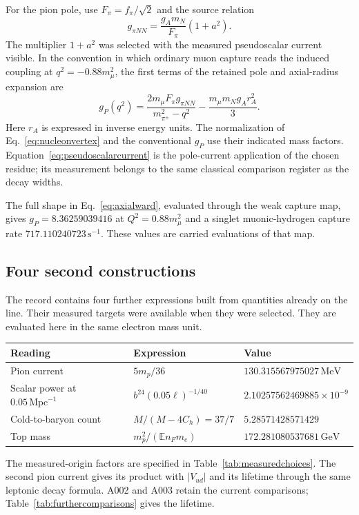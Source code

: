 \documentclass[aps,prx,onecolumn,10pt,notitlepage,nofootinbib,longbibliography]{revtex4-2}
\numberwithin{equation}{section}
\numberwithin{table}{section}
\newcommand{\EE}{\mathbb E}
\newcommand{\MeV}{\,\mathrm{MeV}}
\newcommand{\GeV}{\,\mathrm{GeV}}
\begin{document}
For the pion pole, use $F_\pi=f_\pi/\sqrt2$ and the source relation
\begin{equation}
 g_{\pi NN}=\frac{g_A m_N}{F_\pi}(1+a^2).
 \label{eq:pionnucleoncoupling}
\end{equation}
The multiplier $1+a^2$ was selected with the measured pseudoscalar current
visible. In the convention in which ordinary muon capture reads the induced
coupling at $q^2=-0.88m_\mu^2$, the first terms of the retained pole and axial-radius expansion are
\begin{equation}
 g_P(q^2)=\frac{2m_\mu F_\pi g_{\pi NN}}{m_{\pi^\pm}^2-q^2}
          -\frac{m_\mu m_Ng_A r_A^2}{3}.
 \label{eq:pseudoscalarcurrent}
\end{equation}
Here $r_A$ is expressed in inverse energy units. The normalization of
Eq.~\eqref{eq:nucleonvertex} and the conventional $g_P$ use their indicated
mass factors. Equation~\eqref{eq:pseudoscalarcurrent} is the pole-current
application of the chosen residue; its measurement belongs to the same
classical comparison register as the decay widths.


The full shape in Eq.~\eqref{eq:axialward}, evaluated through the
weak capture map, gives $g_P=8.36259039416$ at $Q^2=0.88m_\mu^2$ and a
singlet muonic-hydrogen capture rate $717.110240723\,\mathrm{s}^{-1}$.
These values are carried evaluations of that map.

\subsection{Four second constructions}
\label{sec:secondconstructions}
The record contains four further expressions built from quantities already
on the line. Their measured targets were available when they were selected.
They are evaluated here in the same electron mass unit.
\begin{center}\small
\begin{tabular}{@{}lll@{}}
\toprule Reading&Expression&Value\\\midrule
Pion current&$5m_p/36$&$130.315567975027\MeV$\\
Scalar power at $0.05\,\mathrm{Mpc}^{-1}$&$b^{24}(0.05\ell)^{-1/40}$&$2.10257562469885\times10^{-9}$\\
Cold-to-baryon count&$M/(M-4C_h)=37/7$&$5.28571428571429$\\
Top mass&$m_p^2/(\EE n_Fm_e)$&$172.281080537681\GeV$\\\bottomrule
\end{tabular}
\end{center}
The measured-origin factors are specified in Table~\ref{tab:measuredchoices}.
The second pion current gives its product with $|V_{ud}|$ and its lifetime
through the same leptonic decay formula. A002 and A003 retain the current
comparisons; Table~\ref{tab:furthercomparisons} gives the lifetime.
\end{document}
